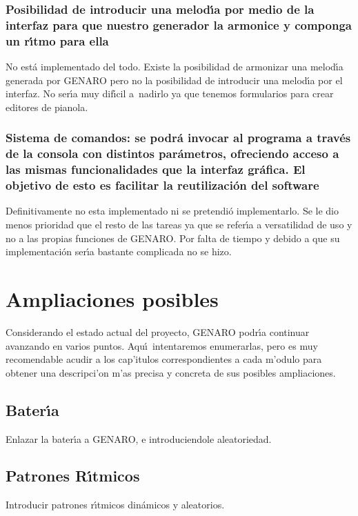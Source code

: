 \subsubsection{Posibilidad de introducir una melod\'\i a por medio de la interfaz para que nuestro generador la armonice y componga un r\'\i tmo para ella}
No est\'a implementado del todo. Existe la posibilidad de armonizar una melod\'\i a generada por GENARO 
pero no la posibilidad de introducir una melod\'\i a por el interfaz. No ser\'\i a muy dif\'\i cil a~nadirlo ya que tenemos formularios para crear editores de pianola.

\subsubsection{Sistema de comandos: se podr\'a invocar al programa a trav\'es de la consola con distintos par\'ametros, ofreciendo acceso a las mismas funcionalidades que la interfaz gr\'afica. El objetivo de esto es facilitar la reutilizaci\'on del software}
Definitivamente no esta implementado ni se pretendi\'o implementarlo. Se le dio menos prioridad que el resto
de las tareas ya que se refer\'\i a a versatilidad de uso y no a las propias funciones de GENARO. Por falta
de tiempo y debido a que su implementaci\'on ser\'\i a bastante complicada no se hizo.


\section{Ampliaciones posibles}

Considerando el estado actual del proyecto, GENARO podr\'\i a continuar avanzando en varios puntos. Aqu\'\i ~intentaremos enumerarlas, pero es muy recomendable acudir a los cap'itulos correspondientes a cada m'odulo para obtener una descripci'on m'as precisa y concreta de sus posibles ampliaciones.

\subsection{Bater\'\i a}

Enlazar la bater\'\i a a GENARO, e introduciendole aleatoriedad.

\subsection{Patrones R\'\i tmicos}

Introducir patrones r\'\i tmicos din\'amicos y aleatorios.

